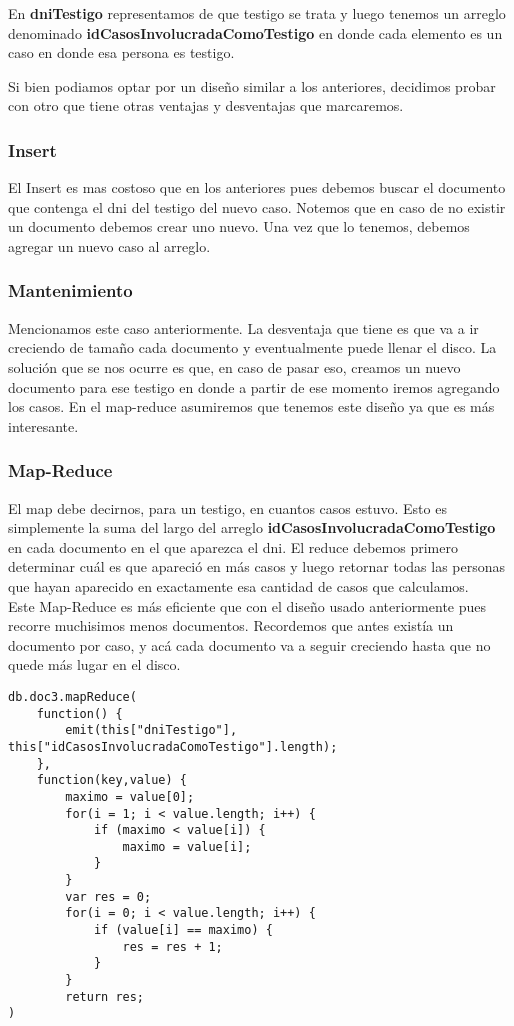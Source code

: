 \documentclass[11pt, a4paper]{article}
\begin{document}
En \textbf{dniTestigo} representamos de que testigo se trata y luego tenemos un arreglo denominado \textbf{idCasosInvolucradaComoTestigo} en donde cada elemento es un caso en donde esa persona es testigo.\

Si bien podiamos optar por un dise\~no similar a los anteriores, decidimos probar con otro que tiene otras ventajas y desventajas que marcaremos.

\subsubsection{Insert}

El Insert es mas costoso que en los anteriores pues debemos buscar el documento que contenga el dni del testigo del nuevo caso. Notemos que en caso de no existir un documento debemos crear uno nuevo. Una vez que lo tenemos, debemos agregar un nuevo caso al arreglo.

\subsubsection{Mantenimiento}

Mencionamos este caso anteriormente. La desventaja que tiene es que va a ir creciendo de tama\~no cada documento y eventualmente puede llenar el disco. La soluci\'on que se nos ocurre es que, en caso de pasar eso, creamos un nuevo documento para ese testigo en donde a partir de ese momento iremos agregando los casos. En el map-reduce asumiremos que tenemos este dise\~no ya que es m\'as interesante.

\subsubsection{Map-Reduce}

El map debe decirnos, para un testigo, en cuantos casos estuvo. Esto es simplemente la suma del largo del arreglo \textbf{idCasosInvolucradaComoTestigo} en cada documento en el que aparezca el dni. El reduce debemos primero determinar cu\'al es que apareci\'o en m\'as casos y luego retornar todas las personas que hayan aparecido en exactamente esa cantidad de casos que calculamos.\\

Este Map-Reduce es m\'as eficiente que con el dise\~no usado anteriormente pues recorre muchisimos menos documentos. Recordemos que antes exist\'ia un documento por caso, y ac\'a cada documento va a seguir creciendo hasta que no quede m\'as lugar en el disco.
\begin{lstlisting}
db.doc3.mapReduce(
    function() {
        emit(this["dniTestigo"], this["idCasosInvolucradaComoTestigo"].length);
    },
    function(key,value) { 
        maximo = value[0];
        for(i = 1; i < value.length; i++) {
            if (maximo < value[i]) { 
                maximo = value[i];  
            }
        }
        var res = 0;
        for(i = 0; i < value.length; i++) {
        	if (value[i] == maximo) {
        		res = res + 1;
        	}
        }
        return res;
)
\end{lstlisting}
\end{document}
